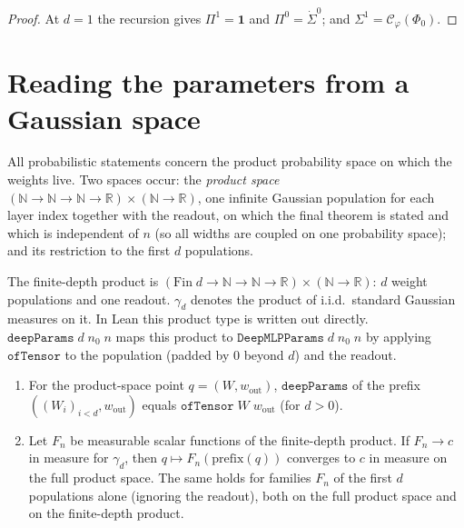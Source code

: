 \begin{proof}
  \leanok
At $d=1$ the recursion gives $\Pi^1=\mathbf 1$ and $\Pi^0=\dot\Sigma^0$; and $\Sigma^1=\mathcal C_\varphi(\Phi_0)$.
\end{proof}


\section{Reading the parameters from a Gaussian space}\label{sec:ntkdn:space}

All probabilistic statements concern the product probability space on which the weights live. Two
spaces occur: the \emph{product space}
$(\mathbb N\to\mathbb N\to\mathbb N\to\mathbb R)\times(\mathbb N\to\mathbb R)$, one infinite
Gaussian population for each layer index together with the readout, on which the final theorem is
stated and which is independent of $n$ (so all widths are coupled on one probability space); and
its restriction to the first $d$ populations.

\begin{definition}\label{def:ntkdn:deepSpace}
  \leanok
The finite-depth product is
$(\mathrm{Fin}\;d\to\mathbb N\to\mathbb N\to\mathbb R)\times(\mathbb N\to\mathbb R)$:
$d$ weight populations and one readout. $\gamma_d$ denotes the product of i.i.d.\ standard
Gaussian measures on it. In Lean this product type is written out directly.
$\texttt{deepParams}\;d\;n_0\;n$ maps this product to
$\texttt{DeepMLPParams}\;d\;n_0\;n$ by applying $\texttt{ofTensor}$ to the population
(padded by $0$ beyond $d$) and the readout.
\end{definition}

\begin{lemma}\label{lem:ntkdn:transport}
  \leanok
\begin{enumerate}
  \item For the product-space point $q=(W,w_{\mathrm{out}})$, $\texttt{deepParams}$ of the prefix $((W_i)_{i<d},w_{\mathrm{out}})$ equals $\texttt{ofTensor}\;W\;w_{\mathrm{out}}$ (for $d>0$).
  \item Let $F_n$ be measurable scalar functions of the finite-depth product. If $F_n\to c$ in measure
    for $\gamma_d$, then $q\mapsto F_n(\text{prefix}(q))$ converges to $c$ in measure on the
    full product space. The same holds for families $F_n$ of the first $d$ populations alone
    (ignoring the readout), both on the full product space and on the finite-depth product.
\end{enumerate}
\end{lemma}

